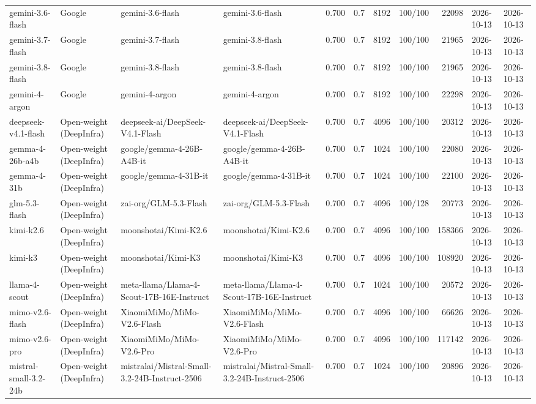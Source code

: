 \begin{table}
\begin{tabular}{llllrlrlrll}
gemini-3.6-flash & Google & gemini-3.6-flash & gemini-3.6-flash & 0.700 & 0.7 & 8192 & 100/100 & 22098 & 2026-10-13 & 2026-10-13 \\
gemini-3.7-flash & Google & gemini-3.7-flash & gemini-3.8-flash & 0.700 & 0.7 & 8192 & 100/100 & 21965 & 2026-10-13 & 2026-10-13 \\
gemini-3.8-flash & Google & gemini-3.8-flash & gemini-3.8-flash & 0.700 & 0.7 & 8192 & 100/100 & 21965 & 2026-10-13 & 2026-10-13 \\
gemini-4-argon & Google & gemini-4-argon & gemini-4-argon & 0.700 & 0.7 & 8192 & 100/100 & 22298 & 2026-10-13 & 2026-10-13 \\
deepseek-v4.1-flash & Open-weight (DeepInfra) & deepseek-ai/DeepSeek-V4.1-Flash & deepseek-ai/DeepSeek-V4.1-Flash & 0.700 & 0.7 & 4096 & 100/100 & 20312 & 2026-10-13 & 2026-10-13 \\
gemma-4-26b-a4b & Open-weight (DeepInfra) & google/gemma-4-26B-A4B-it & google/gemma-4-26B-A4B-it & 0.700 & 0.7 & 1024 & 100/100 & 22080 & 2026-10-13 & 2026-10-13 \\
gemma-4-31b & Open-weight (DeepInfra) & google/gemma-4-31B-it & google/gemma-4-31B-it & 0.700 & 0.7 & 1024 & 100/100 & 22100 & 2026-10-13 & 2026-10-13 \\
glm-5.3-flash & Open-weight (DeepInfra) & zai-org/GLM-5.3-Flash & zai-org/GLM-5.3-Flash & 0.700 & 0.7 & 4096 & 100/128 & 20773 & 2026-10-13 & 2026-10-13 \\
kimi-k2.6 & Open-weight (DeepInfra) & moonshotai/Kimi-K2.6 & moonshotai/Kimi-K2.6 & 0.700 & 0.7 & 4096 & 100/100 & 158366 & 2026-10-13 & 2026-10-13 \\
kimi-k3 & Open-weight (DeepInfra) & moonshotai/Kimi-K3 & moonshotai/Kimi-K3 & 0.700 & 0.7 & 4096 & 100/100 & 108920 & 2026-10-13 & 2026-10-13 \\
llama-4-scout & Open-weight (DeepInfra) & meta-llama/Llama-4-Scout-17B-16E-Instruct & meta-llama/Llama-4-Scout-17B-16E-Instruct & 0.700 & 0.7 & 1024 & 100/100 & 20572 & 2026-10-13 & 2026-10-13 \\
mimo-v2.6-flash & Open-weight (DeepInfra) & XiaomiMiMo/MiMo-V2.6-Flash & XiaomiMiMo/MiMo-V2.6-Flash & 0.700 & 0.7 & 4096 & 100/100 & 66626 & 2026-10-13 & 2026-10-13 \\
mimo-v2.6-pro & Open-weight (DeepInfra) & XiaomiMiMo/MiMo-V2.6-Pro & XiaomiMiMo/MiMo-V2.6-Pro & 0.700 & 0.7 & 4096 & 100/100 & 117142 & 2026-10-13 & 2026-10-13 \\
mistral-small-3.2-24b & Open-weight (DeepInfra) & mistralai/Mistral-Small-3.2-24B-Instruct-2506 & mistralai/Mistral-Small-3.2-24B-Instruct-2506 & 0.700 & 0.7 & 1024 & 100/100 & 20896 & 2026-10-13 & 2026-10-13 \\

\end{tabular}
\end{table}
